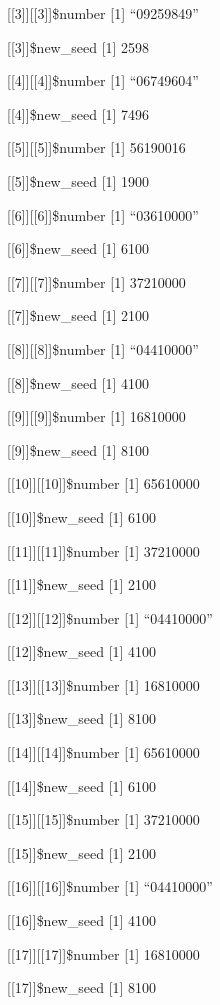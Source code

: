 \documentclass[]{article}
\begin{document}
{[}{[}3{]}{]}{[}{[}3{]}{]}\$number {[}1{]} ``09259849''

{[}{[}3{]}{]}\$new\_seed {[}1{]} 2598

{[}{[}4{]}{]}{[}{[}4{]}{]}\$number {[}1{]} ``06749604''

{[}{[}4{]}{]}\$new\_seed {[}1{]} 7496

{[}{[}5{]}{]}{[}{[}5{]}{]}\$number {[}1{]} 56190016

{[}{[}5{]}{]}\$new\_seed {[}1{]} 1900

{[}{[}6{]}{]}{[}{[}6{]}{]}\$number {[}1{]} ``03610000''

{[}{[}6{]}{]}\$new\_seed {[}1{]} 6100

{[}{[}7{]}{]}{[}{[}7{]}{]}\$number {[}1{]} 37210000

{[}{[}7{]}{]}\$new\_seed {[}1{]} 2100

{[}{[}8{]}{]}{[}{[}8{]}{]}\$number {[}1{]} ``04410000''

{[}{[}8{]}{]}\$new\_seed {[}1{]} 4100

{[}{[}9{]}{]}{[}{[}9{]}{]}\$number {[}1{]} 16810000

{[}{[}9{]}{]}\$new\_seed {[}1{]} 8100

{[}{[}10{]}{]}{[}{[}10{]}{]}\$number {[}1{]} 65610000

{[}{[}10{]}{]}\$new\_seed {[}1{]} 6100

{[}{[}11{]}{]}{[}{[}11{]}{]}\$number {[}1{]} 37210000

{[}{[}11{]}{]}\$new\_seed {[}1{]} 2100

{[}{[}12{]}{]}{[}{[}12{]}{]}\$number {[}1{]} ``04410000''

{[}{[}12{]}{]}\$new\_seed {[}1{]} 4100

{[}{[}13{]}{]}{[}{[}13{]}{]}\$number {[}1{]} 16810000

{[}{[}13{]}{]}\$new\_seed {[}1{]} 8100

{[}{[}14{]}{]}{[}{[}14{]}{]}\$number {[}1{]} 65610000

{[}{[}14{]}{]}\$new\_seed {[}1{]} 6100

{[}{[}15{]}{]}{[}{[}15{]}{]}\$number {[}1{]} 37210000

{[}{[}15{]}{]}\$new\_seed {[}1{]} 2100

{[}{[}16{]}{]}{[}{[}16{]}{]}\$number {[}1{]} ``04410000''

{[}{[}16{]}{]}\$new\_seed {[}1{]} 4100

{[}{[}17{]}{]}{[}{[}17{]}{]}\$number {[}1{]} 16810000

{[}{[}17{]}{]}\$new\_seed {[}1{]} 8100
\end{document}
